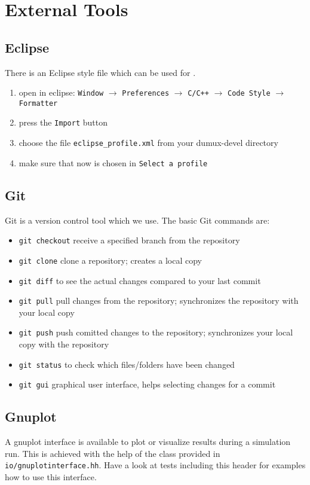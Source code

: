\section{External Tools}
\label{sc_externaltools}

\subsection{Eclipse}
There is an Eclipse style file which can be used for \Dumux.
\begin{enumerate}
  \item open in eclipse: \texttt{Window} $\rightarrow$ \texttt{Preferences} $\rightarrow$
        \texttt{C/C++}  $\rightarrow$ \texttt{Code Style} $\rightarrow$ \texttt{Formatter}
  \item press the \texttt{Import} button
  \item choose the file \texttt{eclipse\_profile.xml} from your dumux-devel directory
  \item make sure that now \Dumux is chosen in \texttt{Select a profile}
\end{enumerate}


\subsection{Git}
Git is a version control tool which we use.
The basic Git commands are:
\begin{itemize}
  \item \texttt{git checkout} receive a specified branch from the repository
  \item \texttt{git clone} clone a repository; creates a local copy
  \item \texttt{git diff} to see the actual changes compared to your last commit
  \item \texttt{git pull} pull changes from the repository; synchronizes the
  repository with your local copy
  \item \texttt{git push} push comitted changes to the repository;  synchronizes
  your local copy with the repository
  \item \texttt{git status} to check which files/folders have been changed
  \item \texttt{git gui} graphical user interface, helps selecting changes for
  a commit
\end{itemize}


\subsection{Gnuplot}
A gnuplot interface is available to plot or visualize results during a simulation run.
This is achieved with the help of the class provided in \texttt{io/gnuplotinterface.hh}.
Have a look at tests including this header for examples how to use this interface.



